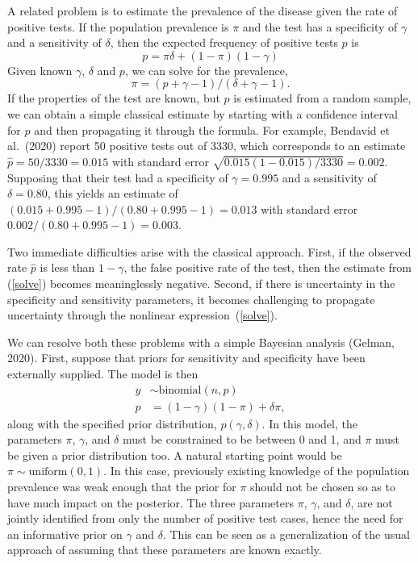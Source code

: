 \documentclass[11pt]{article}
\begin{document}
A related problem is to estimate the prevalence of the disease given
the rate of positive tests.  If the population prevalence is $\pi$ and
the test has a specificity of $\gamma$ and a sensitivity of $\delta$,
then the expected frequency of positive tests $p$ is
%
\begin{equation*}
  p = \pi \delta + (1- \pi)(1-\gamma)
\end{equation*}
%
Given known $\gamma$, $\delta$ and $p$, we can solve for the prevalence,
%
\begin{equation}\label{solve}
  \pi=(p + \gamma - 1)/(\delta + \gamma - 1).
\end{equation}
%
If the properties of the test are known, but $p$ is estimated from a
random sample, we can obtain a simple classical estimate by starting
with a confidence interval for $p$ and then propagating it through the
formula.  For example, Bendavid et al.\ (2020) report 50 positive
tests out of 3330, which corresponds to an estimate
$\hat{p}=50/3330=0.015$ with standard error
$\sqrt{0.015(1-0.015)/3330}=0.002$.  Supposing that their test had a
specificity of $\gamma=0.995$ and a sensitivity of $\delta=0.80$, this
yields an estimate of $(0.015 + 0.995 - 1)/(0.80 + 0.995 -1) = 0.013$
with standard error $0.002/(0.80 + 0.995 -1) = 0.003$.

Two immediate difficulties arise with the classical approach.  First,
if the observed rate $\hat{p}$ is less than $1-\gamma$, the false
positive rate of the test, then the estimate from (\ref{solve})
becomes meaninglessly negative.  Second, if there is uncertainty in
the specificity and sensitivity parameters, it becomes challenging to
propagate uncertainty through the nonlinear expression~(\ref{solve}).

We can resolve both these problems with a simple Bayesian analysis
(Gelman, 2020).  First, suppose that priors for sensitivity and
specificity have been externally supplied.  The model is then
% 
\begin{align}
\nonumber  y & \sim \mbox{binomial} (n, p) \\
 p & = (1-\gamma)(1- \pi)+ \delta\pi , \label{normals} 
\end{align}
%
along with the specified prior distribution, $p(\gamma,\delta)$.  In
this model, the parameters $\pi$, $\gamma$, and $\delta$ must be
constrained to be between 0 and 1, and $\pi$ must be given a prior
distribution too.  A natural starting point would be
$\pi\sim \mbox{uniform}(0,1)$.  In this case, previously existing
knowledge of the population prevalence was weak enough that the prior
for $\pi$ should not be chosen so as to have much impact on the
posterior.  The three parameters $\pi$, $\gamma$, and $\delta$, are
not jointly identified from only the number of positive test cases,
hence the need for an informative prior on $\gamma$ and $\delta$. This
can be seen as a generalization of the usual approach of assuming that
these parameters are known exactly.
\end{document}
